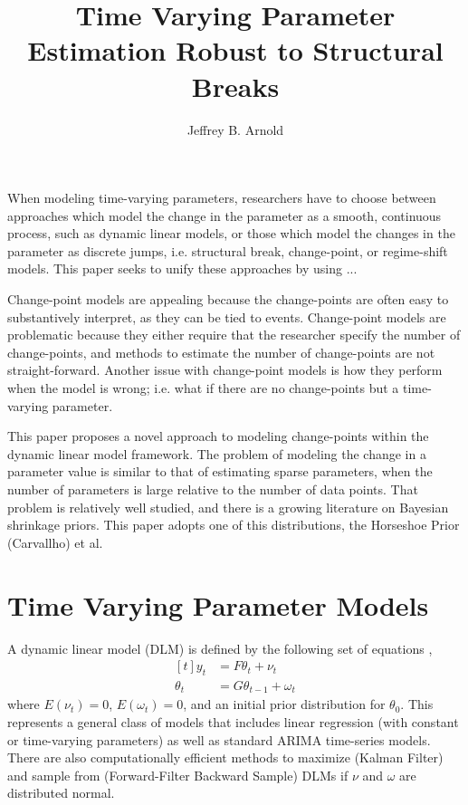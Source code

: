 \documentclass{article}
\author{Jeffrey B. Arnold}
\title{Time Varying Parameter Estimation Robust to Structural Breaks}
\begin{document}
\maketitle{}


When modeling time-varying parameters, researchers have to choose between approaches which model the change in the parameter as a smooth, continuous process, such as dynamic linear models, or those which model the changes in the parameter as discrete jumps, i.e. structural break, change-point, or regime-shift models.
This paper seeks to unify these approaches by using ...

Change-point models are appealing because the change-points are often easy to substantively interpret, as they can be tied to events.
Change-point models are problematic because they either require that the researcher specify the number of change-points, and methods to estimate the number of change-points are not straight-forward.
Another issue with change-point models is how they perform when the model is wrong; i.e. what if there are no change-points but a time-varying parameter.

This paper proposes a novel approach to modeling change-points within the dynamic linear model framework.
The problem of modeling the change in a parameter value is similar to that of estimating sparse parameters, when the number of parameters is large relative to the number of data points.
That problem is relatively well studied, and there is a growing literature on Bayesian shrinkage priors.
This paper adopts one of this distributions, the Horseshoe Prior (Carvallho) et al. 

\section{Time Varying Parameter Models}
\label{sec:time-vary-param}

A dynamic linear model (DLM) is defined by the following set of equations \parencites{WestHarrison1997}{CommandeurKoopman2007},
\begin{equation}
  \label{eq:9}
  \begin{aligned}[t]
    y_{t} &= F \theta_{t} + \nu_{t} \\
    \theta_{t} &= G \theta_{t - 1} + \omega_{t} 
  \end{aligned}
\end{equation}
where $E(\nu_{t}) = 0$, $E(\omega_{t}) = 0$, and an initial prior distribution for $\theta_{0}$.
This represents a general class of models that includes linear regression (with constant or time-varying parameters) as well as standard ARIMA time-series models.
There are also computationally efficient methods to maximize (Kalman Filter) and sample from (Forward-Filter Backward Sample) DLMs if $\nu$ and $\omega$ are distributed normal.
\end{document}
